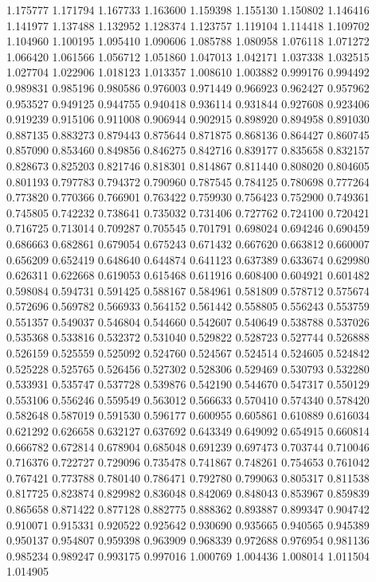1.175777
1.171794
1.167733
1.163600
1.159398
1.155130
1.150802
1.146416
1.141977
1.137488
1.132952
1.128374
1.123757
1.119104
1.114418
1.109702
1.104960
1.100195
1.095410
1.090606
1.085788
1.080958
1.076118
1.071272
1.066420
1.061566
1.056712
1.051860
1.047013
1.042171
1.037338
1.032515
1.027704
1.022906
1.018123
1.013357
1.008610
1.003882
0.999176
0.994492
0.989831
0.985196
0.980586
0.976003
0.971449
0.966923
0.962427
0.957962
0.953527
0.949125
0.944755
0.940418
0.936114
0.931844
0.927608
0.923406
0.919239
0.915106
0.911008
0.906944
0.902915
0.898920
0.894958
0.891030
0.887135
0.883273
0.879443
0.875644
0.871875
0.868136
0.864427
0.860745
0.857090
0.853460
0.849856
0.846275
0.842716
0.839177
0.835658
0.832157
0.828673
0.825203
0.821746
0.818301
0.814867
0.811440
0.808020
0.804605
0.801193
0.797783
0.794372
0.790960
0.787545
0.784125
0.780698
0.777264
0.773820
0.770366
0.766901
0.763422
0.759930
0.756423
0.752900
0.749361
0.745805
0.742232
0.738641
0.735032
0.731406
0.727762
0.724100
0.720421
0.716725
0.713014
0.709287
0.705545
0.701791
0.698024
0.694246
0.690459
0.686663
0.682861
0.679054
0.675243
0.671432
0.667620
0.663812
0.660007
0.656209
0.652419
0.648640
0.644874
0.641123
0.637389
0.633674
0.629980
0.626311
0.622668
0.619053
0.615468
0.611916
0.608400
0.604921
0.601482
0.598084
0.594731
0.591425
0.588167
0.584961
0.581809
0.578712
0.575674
0.572696
0.569782
0.566933
0.564152
0.561442
0.558805
0.556243
0.553759
0.551357
0.549037
0.546804
0.544660
0.542607
0.540649
0.538788
0.537026
0.535368
0.533816
0.532372
0.531040
0.529822
0.528723
0.527744
0.526888
0.526159
0.525559
0.525092
0.524760
0.524567
0.524514
0.524605
0.524842
0.525228
0.525765
0.526456
0.527302
0.528306
0.529469
0.530793
0.532280
0.533931
0.535747
0.537728
0.539876
0.542190
0.544670
0.547317
0.550129
0.553106
0.556246
0.559549
0.563012
0.566633
0.570410
0.574340
0.578420
0.582648
0.587019
0.591530
0.596177
0.600955
0.605861
0.610889
0.616034
0.621292
0.626658
0.632127
0.637692
0.643349
0.649092
0.654915
0.660814
0.666782
0.672814
0.678904
0.685048
0.691239
0.697473
0.703744
0.710046
0.716376
0.722727
0.729096
0.735478
0.741867
0.748261
0.754653
0.761042
0.767421
0.773788
0.780140
0.786471
0.792780
0.799063
0.805317
0.811538
0.817725
0.823874
0.829982
0.836048
0.842069
0.848043
0.853967
0.859839
0.865658
0.871422
0.877128
0.882775
0.888362
0.893887
0.899347
0.904742
0.910071
0.915331
0.920522
0.925642
0.930690
0.935665
0.940565
0.945389
0.950137
0.954807
0.959398
0.963909
0.968339
0.972688
0.976954
0.981136
0.985234
0.989247
0.993175
0.997016
1.000769
1.004436
1.008014
1.011504
1.014905
